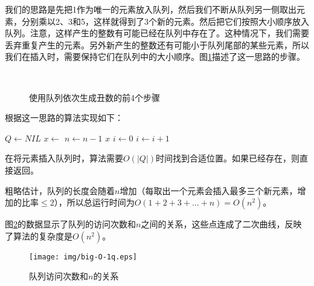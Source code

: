 \documentclass[UTF8]{article}
\begin{document}
我们的思路是先把1作为唯一的元素放入队列，然后我们不断从队列另一侧取出元素，分别乘以2、3和5，这样就得到了3个新的元素。然后把它们按照大小顺序放入队列。注意，这样产生的整数有可能已经在队列中存在了。这种情况下，我们需要丢弃重复产生的元素。另外新产生的整数还有可能小于队列尾部的某些元素，所以我们在插入时，需要保持它们在队列中的大小顺序。图\ref{fig:queues}描述了这一思路的步骤。

\begin{figure}[htbp]
  \renewcommand*\thesubfigure{\arabic{subfigure}}
  \centering
   \hspace{.1\textwidth}
   \\
   \hspace{.1\textwidth}
  \caption{使用队列依次生成丑数的前4个步骤} \label{fig:queues}
\end{figure}

根据这一思路的算法实现如下：

\begin{algorithmic}[1]
  \State $Q \gets NIL$
  \State {}
    \State $x \gets$ 
    \State {}
    \State {}
    \State {}
    \State $n \gets n-1$
  \EndWhile
  \State \Return $x$
\EndFunction
\Statex
{}
  \State $i \gets 0$
    \State $i \gets i + 1$
  \EndWhile
    \State \Return
  \EndIf
  \State {}
\EndFunction
\end{algorithmic}

在将元素插入队列时，算法需要$O(|Q|)$时间找到合适位置。如果已经存在，则直接返回。

粗略估计，队列的长度会随着$n$增加（每取出一个元素会插入最多三个新元素，增加的比率$\leq 2$），所以总运行时间为$O(1+2+3+...+n) = O(n^2)$。

图\ref{fig:big-O-1q}的数据显示了队列的访问次数和$n$之间的关系，这些点连成了二次曲线，反映了算法的复杂度是$O(n^2)$。

\begin{figure}[htbp]
  \centering
  \texttt{[image: img/big-O-1q.eps]}
  \caption{队列访问次数和$n$的关系} \label{fig:big-O-1q}
\end{figure}
\end{document}
